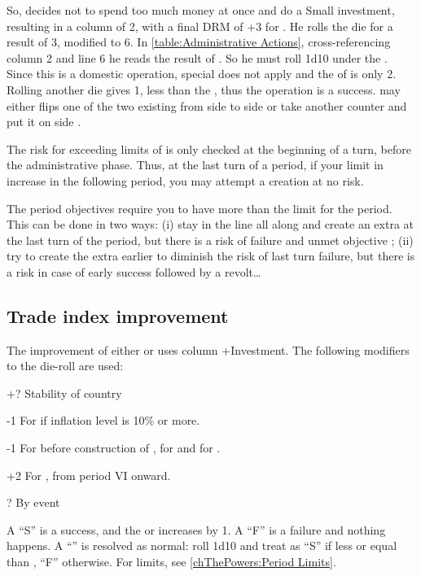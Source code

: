 \begin{exemple}[continued]
  So, \POR decides not to spend too much money at once and do a Small
  investment, resulting in a column of 2, with a final DRM of +3 for \STAB. He
  rolls the die for a result of 3, modified to 6. In \ref{table:Administrative
    Actions}, cross-referencing column 2 and line 6 he reads the result of
  \undemi. So he must roll 1d10 under the \FTI. Since this is a domestic
  operation, special \FTI does not apply and the \FTI of \POR is only
  2. Rolling another die gives 1, less than the \FTI, thus the operation is a
  success. \POR may either flips one of the two existing \MNU from side
  \Facemoins to side \Faceplus or take another \MNU counter and put it on side
  \Facemoins.
\end{exemple}

\begin{designnote}
  The risk for exceeding limits of \MNU is only checked at the beginning of a
  turn, before the administrative phase. Thus, at the last turn of a period,
  if your limit in \MNU increase in the following period, you may attempt a
  \MNU creation at no risk.

  The \MNU period objectives require you to have more \MNU than the limit for
  the period. This can be done in two ways: (i) stay in the line all along and
  create an extra \MNU at the last turn of the period, but there is a risk of
  failure and unmet objective ; (ii) try to create the extra \MNU earlier to
  diminish the risk of last turn failure, but there is a risk in case of early
  success followed by a revolt\ldots
\end{designnote}



\subsection{Trade index improvement}

\aparag The improvement of either \FTI or \DTI uses column +Investment.
\bparag The following modifiers to the die-roll are used:
\begin{modlist}
\item[+?]Stability of country
\item[-1]For \SPA if inflation level is 10\% or more.
\item[-1]For \RUS before construction of , for \TUR
  and for \POL.
\item[+2]For \ENG, from period VI onward.
\item[\textplusminus?]By event
\end{modlist}
\bparag A ``S'' is a success, and the \FTI or \DTI increases by 1.
\bparag A ``F'' is a failure and nothing happens.
\bparag A ``\undemi'' is resolved as normal: roll 1d10 and treat as ``S'' if
less or equal than \FTI, ``F'' otherwise.
\bparag For limits, see \ref{chThePowers:Period Limits}.

